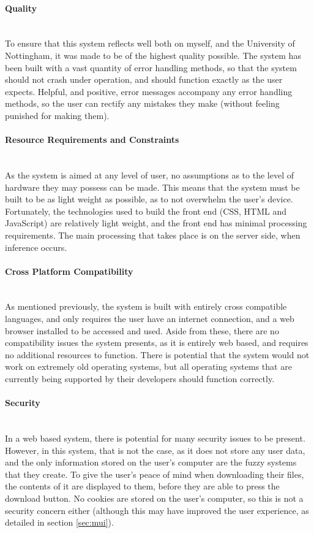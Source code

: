 \paragraph{Quality}\ \\
To ensure that this system reflects well both on myself, and the University of Nottingham, it was made to be of the highest quality possible. The system has been built with a vast quantity of error handling methods, so that the system should not crash under operation, and should function exactly as the user expects. Helpful, and positive, error messages accompany any error handling methods, so the user can rectify any mistakes they make (without feeling punished for making them). 

\paragraph{Resource Requirements and Constraints}\ \\
As the system is aimed at any level of user, no assumptions as to the level of hardware they may possess can be made. This means that the system must be built to be as light weight as possible, as to not overwhelm the user's device. Fortunately, the technologies used to build the front end (CSS, HTML and JavaScript) are relatively light weight, and the front end has minimal processing requirements. The main processing that takes place is on the server side, when inference occurs.

\paragraph{Cross Platform Compatibility}\ \\
As mentioned previously, the system is built with entirely cross compatible languages, and only requires the user have an internet connection, and a web browser installed to be accessed and used. Aside from these, there are no compatibility issues the system presents, as it is entirely web based, and requires no additional resources to function. There is potential that the system would not work on extremely old operating systems, but all operating systems that are currently being supported by their developers should function correctly.

\paragraph{Security}\ \\
In a web based system, there is potential for many security issues to be present. However, in this system, that is not the case, as it does not store any user data, and the only information stored on the user's computer are the fuzzy systems that they create. To give the user's peace of mind when downloading their files, the contents of it are displayed to them, before they are able to press the download button. No cookies are stored on the user's computer, so this is not a security concern either (although this may have improved the user experience, as detailed in section \ref{sec:mui}).


